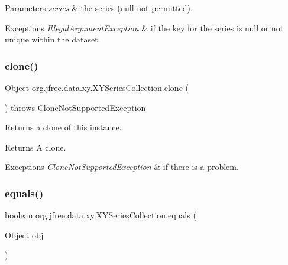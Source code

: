 \begin{DoxyParams}{Parameters}
{\em series} & the series ({\ttfamily null} not permitted).\\
\hline
\end{DoxyParams}

\begin{DoxyExceptions}{Exceptions}
{\em Illegal\+Argument\+Exception} & if the key for the series is null or not unique within the dataset. \\
\hline
\end{DoxyExceptions}
\mbox{\label{classorg_1_1jfree_1_1data_1_1xy_1_1_x_y_series_collection_af089a7b0389a175532d2128ebc4e0ae8}} 
\subsubsection{\texorpdfstring{clone()}{clone()}}
{\footnotesize\ttfamily Object org.\+jfree.\+data.\+xy.\+X\+Y\+Series\+Collection.\+clone (\begin{DoxyParamCaption}{ }\end{DoxyParamCaption}) throws Clone\+Not\+Supported\+Exception}

Returns a clone of this instance.

\begin{DoxyReturn}{Returns}
A clone.
\end{DoxyReturn}

\begin{DoxyExceptions}{Exceptions}
{\em Clone\+Not\+Supported\+Exception} & if there is a problem. \\
\hline
\end{DoxyExceptions}
\mbox{\label{classorg_1_1jfree_1_1data_1_1xy_1_1_x_y_series_collection_aff09e729e65fedc84d57150d5f6393d3}} 
\subsubsection{\texorpdfstring{equals()}{equals()}}
{\footnotesize\ttfamily boolean org.\+jfree.\+data.\+xy.\+X\+Y\+Series\+Collection.\+equals (\begin{DoxyParamCaption}\item[{Object}]{obj }\end{DoxyParamCaption})}

